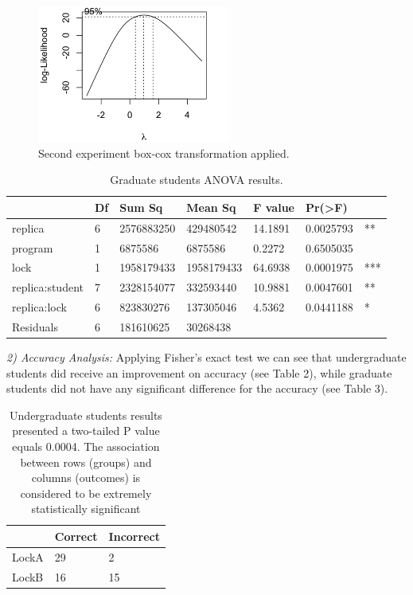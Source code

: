 \begin{figure}
\centering
\includegraphics[height=4.5cm]{img/g2boxcox.png}
\caption{Second experiment box-cox transformation applied.}
\end{figure}

\begin{table}
\begin{center}
\caption{Graduate students ANOVA results.}
\begin{tabular}{|l|l|l|l|l|ll|}
\hline
                 & Df &    Sum Sq &   Mean Sq  & F value &   Pr(>F) & \\   
\hline
replica          & 6 & 2576883250 &  429480542 & 14.1891 & 0.0025793 & **  \\
program          & 1 &    6875586 &    6875586 &  0.2272 & 0.6505035 &     \\
lock             & 1 & 1958179433 & 1958179433 & 64.6938 & 0.0001975 & *** \\
replica:student  & 7 & 2328154077 &  332593440 & 10.9881 & 0.0047601 & **  \\
replica:lock     & 6 &  823830276 &  137305046 &  4.5362 & 0.0441188 & *   \\
Residuals        & 6 &  181610625 &   30268438 &         &           &     \\
\hline
\end{tabular}
\end{center}
\end{table}

\emph{2) Accuracy Analysis:} Applying Fisher's exact test we can see that undergraduate students did receive an improvement on accuracy (see Table 2), while graduate students did not have any significant difference for the accuracy (see Table 3).

\begin{table}
\begin{center}
\caption{Undergraduate students results presented a two-tailed P value equals 0.0004. The association between rows (groups) and columns (outcomes) is considered to be extremely statistically significant}
\begin{tabular}{|l|l|l|}
\hline
 & Correct & Incorrect\\
\hline
LockA & 29 & 2\\
LockB & 16 & 15\\
\hline
\end{tabular}
\end{center}
\end{table}

